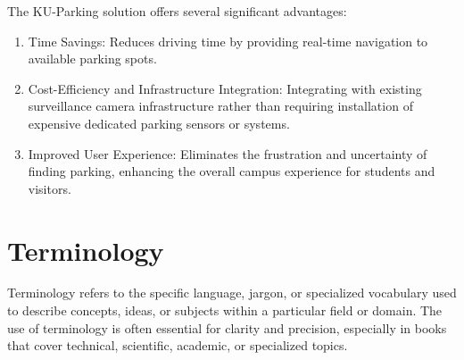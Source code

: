 The KU-Parking solution offers several significant advantages:

\begin{enumerate}[leftmargin=80pt]
    \item Time Savings: Reduces driving time by providing real-time navigation to available parking spots.
    
    \item Cost-Efficiency and Infrastructure Integration: Integrating with existing surveillance camera infrastructure rather than requiring installation of expensive dedicated parking sensors or systems.
    
    \item Improved User Experience: Eliminates the frustration and uncertainty of finding parking, enhancing the overall campus experience for students and visitors.
\end{enumerate}

\section{Terminology}
\label{section:terminology}

Terminology refers to the specific language, jargon, or
specialized vocabulary used to describe concepts, ideas, or subjects within a
particular field or domain. The use of terminology is often essential for clarity
and precision, especially in books that cover technical, scientific, academic, or
specialized topics.
